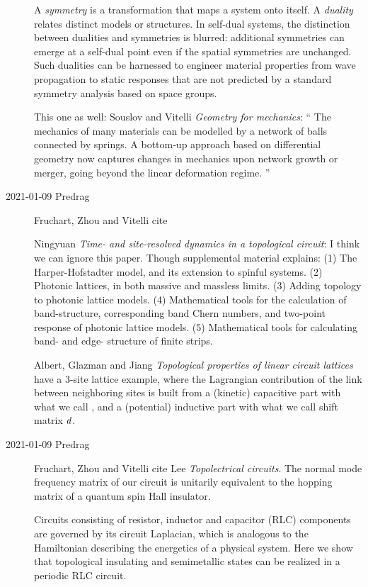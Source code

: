 \begin{description}
A \emph{symmetry} is a transformation that maps a system onto itself.
A \emph{duality} relates distinct models or structures.
In self-dual systems, the distinction between dualities and symmetries is
blurred: additional symmetries can emerge at a self-dual point even if
the spatial symmetries are unchanged.
Such dualities can be harnessed to engineer material properties from wave
propagation to static responses that are not predicted by a standard
symmetry analysis based on space groups.



This one as well:
Souslov and Vitelli {\em Geometry for mechanics}:
``
The mechanics of many materials can be modelled by a network of balls
connected by springs. A bottom-up approach based on differential geometry
now captures changes in mechanics upon network growth or merger, going
beyond the linear deformation regime.
''

\item[2021-01-09 Predrag]
Fruchart, Zhou and Vitelli cite

Ningyuan \etal{}
{\em Time- and site-resolved dynamics in a topological circuit}:
I think we can ignore this paper. Though supplemental material explains:
(1) The Harper-Hofstadter model, and its extension to spinful systems.
(2) Photonic lattices, in both massive and massless limits.
(3) Adding topology to photonic lattice models.
(4) Mathematical tools for the calculation of band-structure,
corresponding band Chern numbers, and two-point response of photonic
lattice models.
(5) Mathematical tools for calculating band- and edge- structure of
finite strips.

Albert, Glazman and Jiang
{\em Topological properties of linear circuit lattices}
have a 3-site lattice example, where the Lagrangian contribution of the
link between neighboring sites is built from
a (kinetic) capacitive part with what we call {\jacobianOrb} \jMorb,
and a (potential)
inductive part with what we call shift matrix $d$.

\item[2021-01-09 Predrag]
Fruchart, Zhou and Vitelli cite
Lee \etal{} {\em Topolectrical circuits}.
The normal mode frequency matrix of our circuit is unitarily equivalent
to the hopping matrix of a quantum spin Hall insulator.

Circuits consisting of resistor, inductor and capacitor (RLC) components
are governed by its circuit Laplacian, which is analogous to the
Hamiltonian describing the energetics of a physical system. Here we show
that topological insulating and semimetallic states can be realized in a
periodic RLC circuit.


\end{description}
